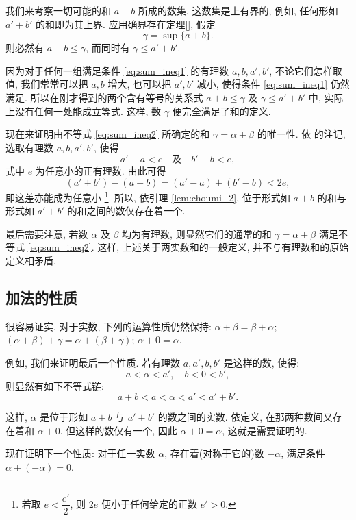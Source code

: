 我们来考察一切可能的和 $a+b$ 所成的数集.
这数集是上有界的, 例如, 任何形如 $a'+b'$ 的和即为其上界.
应用确界存在定理[], 假定
$$ \gamma = \sup\{a+b\}. $$
则必然有 $a+b \leq \gamma$, 而同时有 $\gamma \leq a'+b'$.

因为对于任何一组满足条件 \eqref{eq:sum_ineq1} 的有理数 $a, b, a', b'$, 不论它们怎样取值,
我们常常可以把 $a, b$ 增大, 也可以把 $a', b'$ 减小, 使得条件 \eqref{eq:sum_ineq1} 仍然满足.
所以在刚才得到的两个含有等号的关系式 $a+b \leq \gamma$ 及 $\gamma \leq a'+b'$ 中,
实际上没有任何一处能成立等式.
这样, 数 $\gamma$ 便完全满足了和的定义.

现在来证明由不等式 \eqref{eq:sum_ineq2} 所确定的和 $\gamma = \alpha + \beta$ 的唯一性.
依  的注记, 选取有理数 $a, b, a', b'$, 使得
$$ a' - a < e \quad \text{及} \quad b' - b < e, $$
式中 $e$ 为任意小的正有理数.
由此可得
$$ (a'+b') - (a+b) = (a'-a) + (b'-b) < 2e, $$
即这差亦能成为任意小
\footnote{若取 $e < \dfrac{e'}{2}$, 则 $2e$ 便小于任何给定的正数 $e' > 0$.}.
所以, 依引理 \ref{lem:choumi_2}, 位于形式如 $a+b$ 的和与形式如 $a'+b'$ 的和之间的数仅存在着一个.

最后需要注意, 若数 $\alpha$ 及 $\beta$ 均为有理数,
则显然它们的通常的和 $\gamma = \alpha + \beta$ 满足不等式 \eqref{eq:sum_ineq2}.
这样, 上述关于两实数和的一般定义, 并不与有理数和的原始定义相矛盾.

\subsection{加法的性质}\label{subsec:13}

很容易证实, 对于实数, 下列的运算性质仍然保持:
\label{prop:add_comm} $\alpha + \beta = \beta + \alpha$;
\label{prop:add_assoc} $(\alpha + \beta) + \gamma = \alpha + (\beta + \gamma)$;
\label{prop:add_zero} $\alpha + 0 = \alpha$.

例如, 我们来证明最后一个性质.
若有理数 $a, a', b, b'$ 是这样的数, 使得:
$$ a < \alpha < a', \quad b < 0 < b', $$
则显然有如下不等式链:
$$ a+b < a < \alpha < a' < a'+b'. $$

这样, $\alpha$ 是位于形如 $a+b$ 与 $a'+b'$ 的数之间的实数.
依定义, 在那两种数间又存在着和 $\alpha + 0$.
但这样的数仅有一个, 因此 $\alpha + 0 = \alpha$, 这就是需要证明的.

现在证明下一个性质:
{\kaishu
    \label{prop:add_inv} 对于任一实数 $\alpha$, 存在着(对称于它的)数 $-\alpha$, 满足条件 $\alpha + (-\alpha) = 0$.
}

